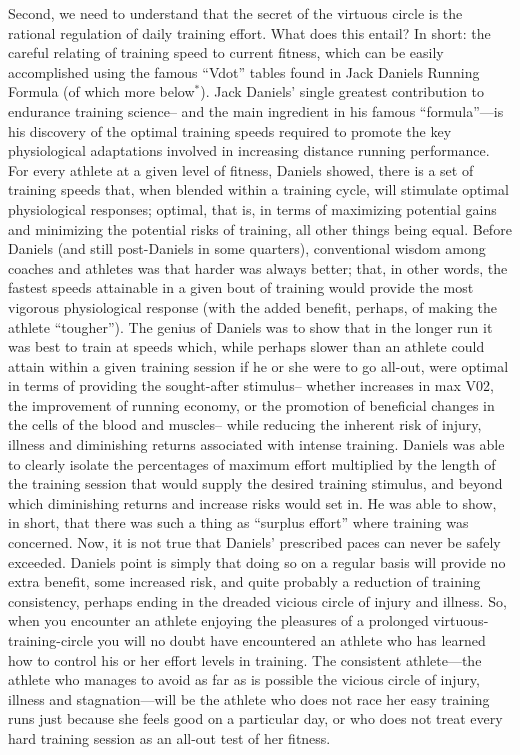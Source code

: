 Second, we need to understand that the secret of the virtuous circle is the rational regulation of daily training effort. What does this entail? In short: the careful relating of training speed to current fitness, which can be easily accomplished using the famous “Vdot” tables found in Jack Daniels Running Formula (of which more below$^*$). Jack Daniels’ single greatest contribution to endurance training science-- and the main ingredient in his famous “formula”—is his discovery of the optimal training speeds required to promote the key physiological adaptations involved in increasing distance running performance. For every athlete at a given level of fitness, Daniels showed, there is a set of training speeds that, when blended within a training cycle, will stimulate optimal physiological responses; optimal, that is, in terms of maximizing potential gains and minimizing the potential risks of training, all other things being equal. Before Daniels (and still post-Daniels in some quarters), conventional wisdom among coaches and athletes was that harder was always better; that, in other words, the fastest speeds attainable in a given bout of training would provide the most vigorous physiological response (with the added benefit, perhaps, of making the athlete “tougher”). The genius of Daniels was to show that in the longer run it was best to train at speeds which, while perhaps slower than an athlete could attain within a given training session if he or she were to go all-out, were optimal in terms of providing the sought-after stimulus-- whether increases in max V02, the improvement of running economy, or the promotion of beneficial changes in the cells of the blood and muscles-- while reducing the inherent risk of injury, illness and diminishing returns associated with intense training. Daniels was able to clearly isolate the percentages of maximum effort multiplied by the length of the training session that would supply the desired training stimulus, and beyond which diminishing returns and increase risks would set in. He was able to show, in short, that there was such a thing as “surplus effort” where training was concerned. Now, it is not true that Daniels’ prescribed paces can never be safely exceeded. Daniels point is simply that doing so on a regular basis will provide no extra benefit, some increased risk, and quite probably a reduction of training consistency, perhaps ending in the dreaded vicious circle of injury and illness. So, when you encounter an athlete enjoying the pleasures of a prolonged virtuous-training-circle you will no doubt have encountered an athlete who has learned how to control his or her effort levels in training. The consistent athlete—the athlete who manages to avoid as far as is possible the vicious circle of injury, illness and stagnation—will be the athlete who does not race her easy training runs just because she feels good on a particular day, or who does not treat every hard training session as an all-out test of her fitness.

